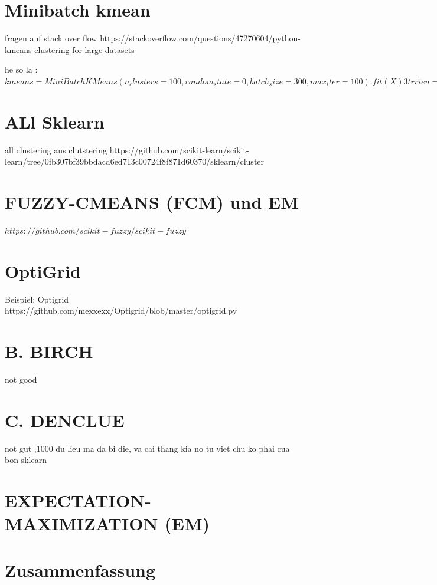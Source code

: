 \documentclass[13pt,a4paper,oneside]{article}
\begin{document}
\section{Minibatch kmean}

fragen auf stack over flow
https://stackoverflow.com/questions/47270604/python-kmeans-clustering-for-large-datasets

he so la : 
$kmeans = MiniBatchKMeans(n_clusters=100,
random_state = 0,
batch_size = 300,
max_iter = 100).fit(X)
3 trrieu = 79s
1 trieu = 22s	
4 trieu = 116.7942 s 
(5000000, 100) 5 trieu 
Elapsed time to cluster in MInibatch kmeans :  190.0804 s 
$
\section{ALl Sklearn}
all clustering aus clutstering
https://github.com/scikit-learn/scikit-learn/tree/0fb307bf39bbdacd6ed713c00724f8f871d60370/sklearn/cluster
\section{FUZZY-CMEANS (FCM) und EM	}
$https://github.com/scikit-fuzzy/scikit-fuzzy$
\section{OptiGrid}
Beispiel: Optigrid
https://github.com/mexxexx/Optigrid/blob/master/optigrid.py
\section{B. BIRCH}
not good
\section{C. DENCLUE}
not gut ,1000 du lieu ma da bi die, va cai thang kia no tu viet chu ko phai cua bon sklearn
\section{EXPECTATION-MAXIMIZATION (EM)}


\section{Zusammenfassung}

\newpage


\end{document}
